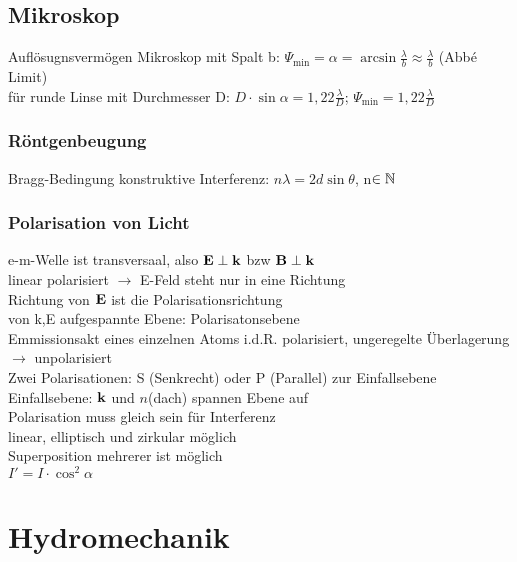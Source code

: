 \documentclass[fs, footer]{latex4ei}
\begin{document}
\begin{multicols*}{4}
\subsection{Mikroskop}
Auflösugnsvermögen Mikroskop mit Spalt b: $\Psi_{\text{min}} = \alpha = \arcsin\frac{\lambda}{b} \approx \frac{\lambda}{b}$ (Abbé Limit)\\
für runde Linse mit Durchmesser D: $D\cdot\sin\alpha = 1,22\frac{\lambda}{D}$; $\Psi_{\text{min}} = 1,22\frac{\lambda}{D}$\\
\subsubsection{Röntgenbeugung}
Bragg-Bedingung konstruktive Interferenz: $n\lambda = 2d\sin\theta $, n$\in \mathbb{N} $\\
\subsubsection{Polarisation von Licht}
e-m-Welle ist transversaal, also $\textbf{E} \perp \textbf{k}$ bzw $\textbf{B}\perp\textbf{k}$\\
linear polarisiert $\rightarrow$ E-Feld steht nur in eine Richtung\\
Richtung von $\textbf{E}$ ist die Polarisationsrichtung\\
von k,E aufgespannte Ebene: Polarisatonsebene\\
Emmissionsakt eines einzelnen Atoms i.d.R. polarisiert, ungeregelte Überlagerung $\rightarrow$ unpolarisiert\\
Zwei Polarisationen:
S (Senkrecht) oder P (Parallel) zur Einfallsebene\\
Einfallsebene: $\textbf{k}$ und $n$(dach) spannen Ebene auf\\
Polarisation muss gleich sein für Interferenz\\
linear, elliptisch und zirkular möglich\\
Superposition mehrerer ist möglich\\
$I' = I\cdot\cos ^2\alpha$\\





\section{Hydromechanik}




\end{multicols*}
\end{document}
